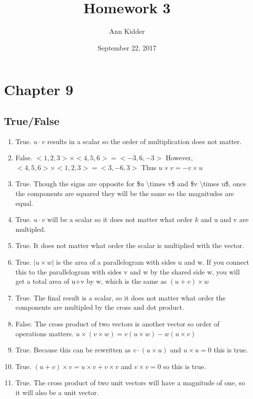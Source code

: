 \documentclass{article}%
\title{Homework 3}%
\author{Ann Kidder}%
\date{September 22, 2017}%
\begin{document}
%
\normalsize%
\maketitle%
\section{Chapter 9}%
\subsection{True/False}%
\begin{enumerate}%
\item%
True. $u\cdot v$ results in a scalar so the order of multiplication does not matter.%
\item%
False. $<1,2,3>\times <4,5,6> = <-3,6,-3>$ However, $<4,5,6> \times <1,2,3> = <3,-6,3>$                     Thus $u \times v = -v \times u$%
\item%
True. Though the signs are opposite for \$u \textbackslash{}times v\$ and \$v \textbackslash{}times u\$, once the components are                     squared they will be the same so the magnitudes are equal.%
\item%
True.  $u \cdot v$ will be a scalar so it does not matter what order $k$ and u and v are multipled.%
\item%
True.  It does not matter what order the scalar is multiplied with the vector.%
\item%
True. $|u \times w|$ is the area of a parallelogram with sides u and w.                      If you connect this to the parallelogram with sides v and w by the shared side w, you will get a total area                     of u+v by w, which is the same as $(u+v) \times w$%
\item%
True.  The final result is a scalar, so it does not matter what order the components are multipled by the cross and dot product.%
\item%
False. The cross product of two vectors is another vector so order of operations matters.                      $u \times (v \times w) = v(u \times w) - w(u \times v)$%
\item%
True.  Because this can be rewritten as $v \cdot (u \times u)$ and $u \times u = 0$ this is true.%
\item%
True.  $(u+v)\times v = u \times v + v \times v$ and $v\times v = 0$ so this is true.%
\item%
True. The cross product of two unit vectors will have a magnitude of one, so it will also be a unit vector.%

\end{enumerate}
\end{document}

